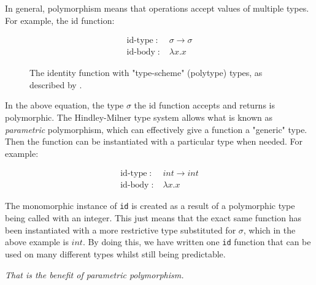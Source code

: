 \documentclass{l4proj}
\begin{document}
In general, polymorphism means that operations accept values of multiple types. For example, the id function:
\begin{figure}[H]
\begin{align*} 
   \text{id-type} \; :& \; \sigma \rightarrow \sigma\\
   \text{id-body} \; :& \; \lambda x . x
\end{align*}
\caption{The identity function with "type-scheme" (polytype) types, as described by \citet{Hindley_1969}.}
\end{figure}

In the above equation, the type $\sigma$ the id function accepts and returns is polymorphic.
The Hindley-Milner type system allows what is known as \emph{parametric} polymorphism, which can effectively give a function a "generic" type.
Then the function can be instantiated with a particular type when needed. 
For example:

\begin{align*}\label{eq:lambda-id-instantiated} 
    \text{id-type} \; :& \; int \rightarrow int \\
    \text{id-body} \; :& \; \lambda x . x
\end{align*}

The monomorphic instance of \texttt{id} is created as a result of a polymorphic type being called with an integer.
This just means that the exact same function has been instantiated with a more restrictive type substituted for $\sigma$, which in the above example is $int$.
By doing this, we have written one \texttt{id} function that can be used on many different types whilst still being predictable.

\emph{That is the benefit of parametric polymorphism.}




\end{document}

